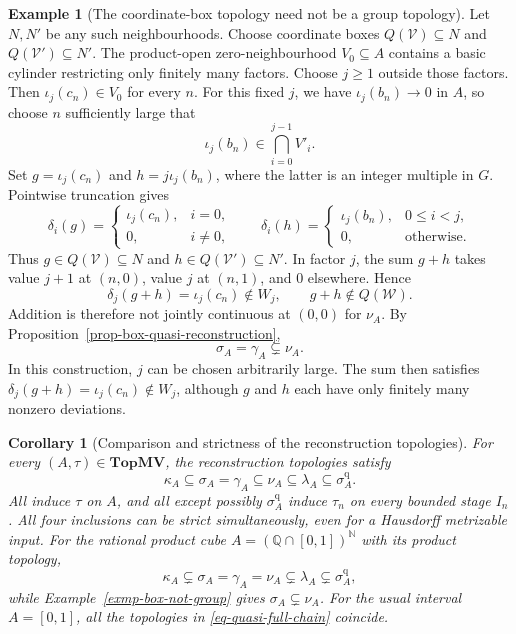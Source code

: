 \documentclass[preprint,3p]{elsarticle}
\theoremstyle{plain}
\newtheorem{cor}[thm]{Corollary}
\theoremstyle{definition}
\newtheorem{exmp}[thm]{Example}
\newcommand{\TopMV}{\mathbf{TopMV}}
\numberwithin{equation}{section}
\begin{document}
\begin{exmp}[The coordinate-box topology need not be a group topology]
Let $N,N'$ be any such neighbourhoods.
Choose coordinate boxes $Q(\mathcal V)\subseteq N$ and
$Q(\mathcal V')\subseteq N'$.
The product-open zero-neighbourhood $V_0\subseteq A$ contains
a basic cylinder restricting only finitely many factors.
Choose $j\geq1$ outside those factors.  Then
$\iota_j(c_n)\in V_0$ for every $n$.
For this fixed $j$, we have $\iota_j(b_n)\to0$ in $A$, so choose
$n$ sufficiently large that
\[
 \iota_j(b_n)\in\bigcap_{i=0}^{j-1}V'_i.
\]
Set $g=\iota_j(c_n)$ and $h=j\iota_j(b_n)$, where the latter is
an integer multiple in $G$.  Pointwise truncation gives
\[
 \delta_i(g)=
 \begin{cases}
  \iota_j(c_n),&i=0,\\
  0,&i\ne0,
 \end{cases}
 \qquad
 \delta_i(h)=
 \begin{cases}
  \iota_j(b_n),&0\leq i<j,\\
  0,&\text{otherwise}.
 \end{cases}
\]
Thus $g\in Q(\mathcal V)\subseteq N$ and
$h\in Q(\mathcal V')\subseteq N'$.
In factor $j$, the sum $g+h$ takes value $j+1$ at $(n,0)$,
value $j$ at $(n,1)$, and $0$ elsewhere.  Hence
\[
 \delta_j(g+h)=\iota_j(c_n)\notin W_j,
 \qquad g+h\notin Q(\mathcal W).
\]
Addition is therefore not jointly continuous at $(0,0)$ for
$\nu_A$.  By Proposition~\ref{prop-box-quasi-reconstruction},
\[
 \sigma_A=\gamma_A\subsetneq\nu_A.
\]
In this construction, $j$ can be chosen arbitrarily large.
The sum then satisfies $\delta_j(g+h)=\iota_j(c_n)\notin W_j$,
although $g$ and $h$ each have only finitely many nonzero deviations.
\end{exmp}

\begin{cor}[Comparison and strictness of the reconstruction topologies]
\label{cor-quasi-full-chain}
For every $(A,\tau)\in\TopMV$, the reconstruction topologies satisfy
\begin{equation}
\label{eq-quasi-full-chain}
 \kappa_A\subseteq\sigma_A=\gamma_A
 \subseteq\nu_A\subseteq\lambda_A
 \subseteq\sigma_A^{\mathrm q}.
\end{equation}
All induce $\tau$ on $A$, and all except possibly
$\sigma_A^{\mathrm q}$ induce $\tau_n$ on every bounded stage $I_n$.
All four inclusions can be strict simultaneously, even for a
Hausdorff metrizable input.
For the rational product cube
$A=(\mathbb Q\cap[0,1])^{\mathbb N}$ with its product topology,
\begin{equation}
\label{eq-quasi-full-chain-strict}
 \kappa_A\subsetneq\sigma_A=\gamma_A=\nu_A
 \subsetneq\lambda_A\subsetneq\sigma_A^{\mathrm q},
\end{equation}
while Example~\ref{exmp-box-not-group} gives
$\sigma_A\subsetneq\nu_A$.
For the usual interval $A=[0,1]$, all the topologies in
\eqref{eq-quasi-full-chain} coincide.
\end{cor}
\end{document}
